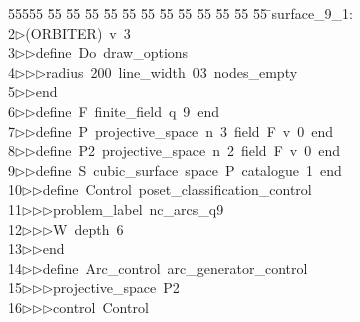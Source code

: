 %
%
\begin{tabbing}
55555 \= 55 \= 55 \= 55 \= 55 \= 55 \= 55 \= 55 \= 55 \= 55 \= 55 \= 55 \= 55 \= \>surface\_9\_1:\\[0pt]
2\>$\triangleright$\>(ORBITER)\ v\ 3\ \\[0pt]
3\>$\triangleright$\>$\triangleright$\>define\ Do\ draw\_options\ \\[0pt]
4\>$\triangleright$\>$\triangleright$\>$\triangleright$\>radius\ 200\ line\_width\ 03\ nodes\_empty\ \\[0pt]
5\>$\triangleright$\>$\triangleright$\>end\ \\[0pt]
6\>$\triangleright$\>$\triangleright$\>define\ F\ finite\_field\ q\ 9\ end\ \\[0pt]
7\>$\triangleright$\>$\triangleright$\>define\ P\ projective\_space\ n\ 3\ field\ F\ v\ 0\ end\ \\[0pt]
8\>$\triangleright$\>$\triangleright$\>define\ P2\ projective\_space\ n\ 2\ field\ F\ v\ 0\ end\ \\[0pt]
9\>$\triangleright$\>$\triangleright$\>define\ S\ cubic\_surface\ space\ P\ catalogue\ 1\ end\ \\[0pt]
10\>$\triangleright$\>$\triangleright$\>define\ Control\ poset\_classification\_control\ \\[0pt]
11\>$\triangleright$\>$\triangleright$\>$\triangleright$\>problem\_label\ nc\_arcs\_q9\ \\[0pt]
12\>$\triangleright$\>$\triangleright$\>$\triangleright$\>W\ depth\ 6\ \\[0pt]
13\>$\triangleright$\>$\triangleright$\>end\ \\[0pt]
14\>$\triangleright$\>$\triangleright$\>define\ Arc\_control\ arc\_generator\_control\ \\[0pt]
15\>$\triangleright$\>$\triangleright$\>$\triangleright$\>projective\_space\ P2\ \\[0pt]
16\>$\triangleright$\>$\triangleright$\>$\triangleright$\>control\ Control\ \\[0pt]

\end{tabbing}
